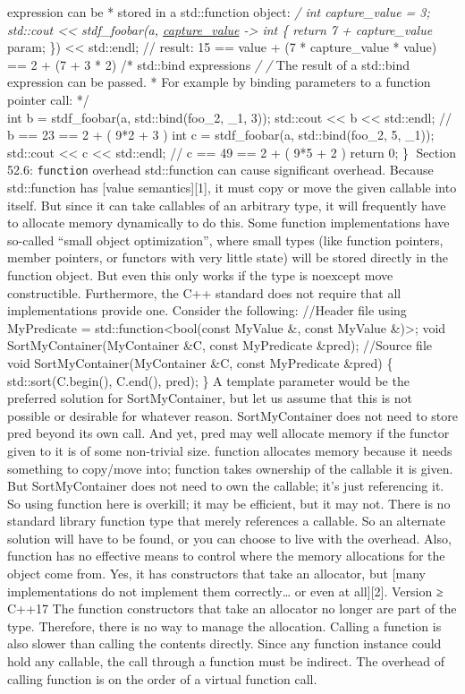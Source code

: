 expression can be * stored in a std::function object: \emph{/ int
capture\_value = 3; std::cout \textless\textless{} stdf\_foobar(a,
\href{int\%20param}{capture\_value} -\textgreater{} int \{ return 7 +
capture\_value } param; \}) \textless\textless{} std::endl; // result:
15 == value + (7 * capture\_value * value) == 2 + (7 + 3 * 2) /*
std::bind expressions \emph{/ /} The result of a std::bind expression
can be passed. * For example by binding parameters to a function pointer
call: */\\
int b = stdf\_foobar(a, std::bind(foo\_2, \_1, 3)); std::cout
\textless\textless{} b \textless\textless{} std::endl; // b == 23 == 2 +
( 9*2 + 3 ) int c = stdf\_foobar(a, std::bind(foo\_2, 5, \_1));
std::cout \textless\textless{} c \textless\textless{} std::endl; // c ==
49 == 2 + ( 9*5 + 2 ) return 0; \} Section 52.6:
\passthrough{\lstinline!function!} overhead std::function can cause
signiﬁcant overhead. Because std::function has {[}value
semantics{]}{[}1{]}, it must copy or move the given callable into
itself. But since it can take callables of an arbitrary type, it will
frequently have to allocate memory dynamically to do this. Some function
implementations have so-called ``small object optimization'', where
small types (like function pointers, member pointers, or functors with
very little state) will be stored directly in the function object. But
even this only works if the type is noexcept move constructible.
Furthermore, the C++ standard does not require that all implementations
provide one. Consider the following: //Header file using MyPredicate =
std::function\textless bool(const MyValue \&, const MyValue
\&)\textgreater; void SortMyContainer(MyContainer \&C, const MyPredicate
\&pred); //Source file void SortMyContainer(MyContainer \&C, const
MyPredicate \&pred) \{ std::sort(C.begin(), C.end(), pred); \} A
template parameter would be the preferred solution for SortMyContainer,
but let us assume that this is not possible or desirable for whatever
reason. SortMyContainer does not need to store pred beyond its own call.
And yet, pred may well allocate memory if the functor given to it is of
some non-trivial size. function allocates memory because it needs
something to copy/move into; function takes ownership of the callable it
is given. But SortMyContainer does not need to own the callable; it's
just referencing it. So using function here is overkill; it may be
eﬃcient, but it may not. There is no standard library function type that
merely references a callable. So an alternate solution will have to be
found, or you can choose to live with the overhead. Also, function has
no eﬀective means to control where the memory allocations for the object
come from. Yes, it has constructors that take an allocator, but {[}many
implementations do not implement them correctly\ldots{} or even at
all{]}{[}2{]}. Version ≥ C++17 The function constructors that take an
allocator no longer are part of the type. Therefore, there is no way to
manage the allocation. Calling a function is also slower than calling
the contents directly. Since any function instance could hold any
callable, the call through a function must be indirect. The overhead of
calling function is on the order of a virtual function call.

